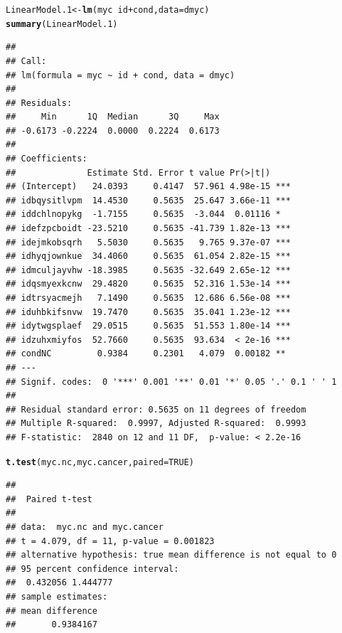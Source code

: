 \documentclass{config/apuntes}\usepackage[]{graphicx}\usepackage[]{xcolor}
\makeatletter
\newcommand{\hlnum}[1]{\textcolor[rgb]{0.686,0.059,0.569}{#1}}%
\newcommand{\hlopt}[1]{\textcolor[rgb]{0,0,0}{#1}}%
\newcommand{\hldef}[1]{\textcolor[rgb]{0.345,0.345,0.345}{#1}}%
\newcommand{\hlkwb}[1]{\textcolor[rgb]{0.69,0.353,0.396}{#1}}%
\newcommand{\hlkwc}[1]{\textcolor[rgb]{0.333,0.667,0.333}{#1}}%
\newcommand{\hlkwd}[1]{\textcolor[rgb]{0.737,0.353,0.396}{\textbf{#1}}}%
\newenvironment{kframe}{%
 \def\at@end@of@kframe{}%
 \ifinner\ifhmode%
  \def\at@end@of@kframe{\end{minipage}}%
  \begin{minipage}{\columnwidth}%
 \fi\fi%
 \def\FrameCommand##1{\hskip\@totalleftmargin \hskip-\fboxsep
 \colorbox{shadecolor}{##1}\hskip-\fboxsep
     \hskip-\linewidth \hskip-\@totalleftmargin \hskip\columnwidth}%
 \MakeFramed {\advance\hsize-\width
   \@totalleftmargin\z@ \linewidth\hsize
   \@setminipage}}%
 {\par\unskip\endMakeFramed%
 \at@end@of@kframe}
\newenvironment{knitrout}{}{} %
\makeatother
\begin{document}
\begin{knitrout}
\color{fgcolor}\begin{kframe}
\begin{alltt}
\hldef{LinearModel.1} \hlkwb{<-} \hlkwd{lm}\hldef{(myc} \hlopt{~} \hldef{id} \hlopt{+} \hldef{cond,} \hlkwc{data} \hldef{= dmyc)}
\hlkwd{summary}\hldef{(LinearModel.1)}
\end{alltt}
\begin{verbatim}
## 
## Call:
## lm(formula = myc ~ id + cond, data = dmyc)
## 
## Residuals:
##     Min      1Q  Median      3Q     Max 
## -0.6173 -0.2224  0.0000  0.2224  0.6173 
## 
## Coefficients:
##              Estimate Std. Error t value Pr(>|t|)    
## (Intercept)   24.0393     0.4147  57.961 4.98e-15 ***
## idbqysitlvpm  14.4530     0.5635  25.647 3.66e-11 ***
## iddchlnopykg  -1.7155     0.5635  -3.044  0.01116 *  
## idefzpcboidt -23.5210     0.5635 -41.739 1.82e-13 ***
## idejmkobsqrh   5.5030     0.5635   9.765 9.37e-07 ***
## idhyqjownkue  34.4060     0.5635  61.054 2.82e-15 ***
## idmculjayvhw -18.3985     0.5635 -32.649 2.65e-12 ***
## idqsmyexkcnw  29.4820     0.5635  52.316 1.53e-14 ***
## idtrsyacmejh   7.1490     0.5635  12.686 6.56e-08 ***
## iduhbkifsnvw  19.7470     0.5635  35.041 1.23e-12 ***
## idytwgsplaef  29.0515     0.5635  51.553 1.80e-14 ***
## idzuhxmiyfos  52.7660     0.5635  93.634  < 2e-16 ***
## condNC         0.9384     0.2301   4.079  0.00182 ** 
## ---
## Signif. codes:  0 '***' 0.001 '**' 0.01 '*' 0.05 '.' 0.1 ' ' 1
## 
## Residual standard error: 0.5635 on 11 degrees of freedom
## Multiple R-squared:  0.9997,	Adjusted R-squared:  0.9993 
## F-statistic:  2840 on 12 and 11 DF,  p-value: < 2.2e-16
\end{verbatim}
\begin{alltt}
\hlkwd{t.test}\hldef{(myc.nc, myc.cancer,} \hlkwc{paired} \hldef{=} \hlnum{TRUE}\hldef{)}
\end{alltt}
\begin{verbatim}
## 
## 	Paired t-test
## 
## data:  myc.nc and myc.cancer
## t = 4.079, df = 11, p-value = 0.001823
## alternative hypothesis: true mean difference is not equal to 0
## 95 percent confidence interval:
##  0.432056 1.444777
## sample estimates:
## mean difference 
##       0.9384167
\end{verbatim}
\end{kframe}
\end{knitrout}
\end{document}
